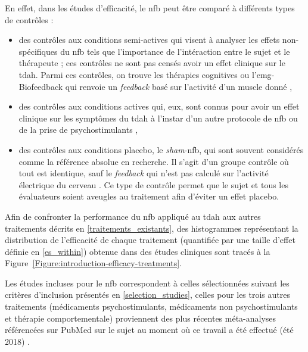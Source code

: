 En effet, dans les études d'efficacité, le \gls{nfb} peut être comparé à différents types de contrôles \citep{Arns2014} :
\begin{itemize}
\item des contrôles aux conditions semi-actives qui visent à analyser les effets non-spécifiques du \gls{nfb} tels que l'importance de l'intéraction entre le sujet et le thérapeute ; 
ces contrôles ne sont pas censés avoir un effet clinique sur le \gls{tdah}. Parmi ces contrôles, on trouve les thérapies cognitives ou l'\gls{emg}-Biofeedback qui renvoie un \textit{feedback} basé
sur l'activité d'un muscle donné \citep{Bakhshayesh2011},
\item des contrôles aux conditions actives qui, eux, sont connus pour avoir un effet clinique sur les symptômes du \gls{tdah} à l'instar d'un autre protocole de \gls{nfb} \citep{Leins2007} ou
de la prise de psychostimulants \citep{Meisel2014},
\item des contrôles aux conditions placebo, le \textit{sham}-\gls{nfb}, qui sont souvent considérés comme la référence absolue en recherche. Il s'agit d'un groupe contrôle
où tout est identique, sauf le \textit{feedback} qui n'est pas calculé sur l'activité électrique du cerveau \citep{Arnold2014}. Ce type de contrôle permet 
que le sujet et tous les évaluateurs soient aveugles au traitement afin d'éviter un effet placebo.
\end{itemize}

Afin de confronter la performance du \gls{nfb} appliqué au \gls{tdah} aux autres traitements décrits en \ref{traitements_existants}, des histogrammes
représentant la distribution de l'efficacité de chaque traitement (quantifiée par une taille d'effet définie en \ref{es_within}) obtenue dans des études cliniques
sont tracés à la Figure~\ref{Figure:introduction-efficacy-treatments}.

Les études incluses pour le \gls{nfb} correspondent à celles sélectionnées suivant les critères d'inclusion présentés en \ref{selection_studies}, celles pour les
trois autres traitements (médicaments psychostimulants, médicaments non psychostimulants et thérapie comportementale) proviennent des plus récentes méta-analyses 
référencées sur PubMed sur le sujet au moment où ce travail a été effectué (été 2018) \citep{Luan2017, Catala2017}.

